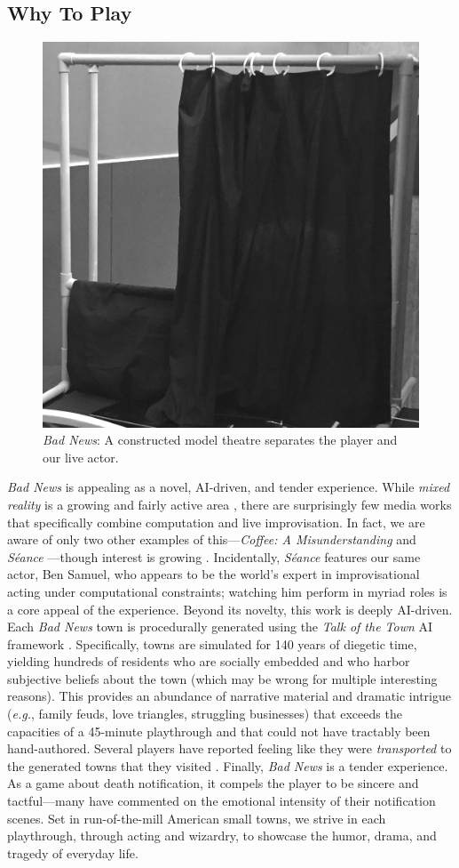 \documentclass[letterpaper]{article}
\begin{document}
\subsection{Why To Play}


\begin{figure}[t]
  \centering
  \includegraphics[width=0.64\columnwidth]{images/bad_news-the_puppet_theatre}
  \caption{\textit{Bad News}: A constructed model theatre separates the player and our live actor.}
  \label{fig:bn-model_theatre}
\end{figure}

\textit{Bad News} is appealing as a novel, AI-driven, and tender experience. While \textit{mixed reality} is a growing and fairly active area \cite{ohta2014mixed}, there are surprisingly few media works that specifically combine computation and live improvisation. In fact, we are aware of only two other examples of this---\textit{Coffee: A Misunderstanding} \cite{squinkifer2014coffee} and \textit{S\'{e}ance} \cite{seance}---though interest is growing \cite{martens2016towards}. Incidentally, \textit{S\'{e}ance} features our same actor, Ben Samuel, who appears to be the world's expert in improvisational acting under computational constraints; watching him perform in myriad roles is a core appeal of the experience. Beyond its novelty, this work is deeply AI-driven. Each \textit{Bad News} town is procedurally generated using the \textit{Talk of the Town} AI framework \cite{ryan2015toward}. Specifically, towns are simulated for 140 years of diegetic time, yielding hundreds of residents who are socially embedded and who harbor subjective beliefs about the town (which may be wrong for multiple interesting reasons). This provides an abundance of narrative material and dramatic intrigue (\textit{e.g.}, family feuds, love triangles, struggling businesses) that exceeds the capacities of a 45-minute playthrough and that could not have tractably been hand-authored. Several players have reported feeling like they were \textit{transported} to the generated towns that they visited \cite{green2004understanding}. Finally, \textit{Bad News} is a tender experience. As a game about death notification, it compels the player to be sincere and tactful---many have commented on the emotional intensity of their notification scenes. Set in run-of-the-mill American small towns, we strive in each playthrough, through acting and wizardry, to showcase the humor, drama, and tragedy of everyday life.
\end{document}
